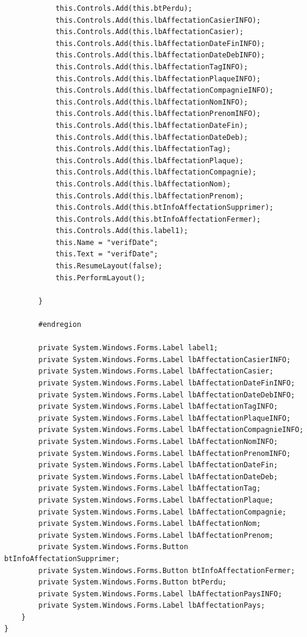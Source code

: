 \documentclass[main.tex]{subfiles}
\begin{document}
\begin{lstlisting}
            this.Controls.Add(this.btPerdu);
            this.Controls.Add(this.lbAffectationCasierINFO);
            this.Controls.Add(this.lbAffectationCasier);
            this.Controls.Add(this.lbAffectationDateFinINFO);
            this.Controls.Add(this.lbAffectationDateDebINFO);
            this.Controls.Add(this.lbAffectationTagINFO);
            this.Controls.Add(this.lbAffectationPlaqueINFO);
            this.Controls.Add(this.lbAffectationCompagnieINFO);
            this.Controls.Add(this.lbAffectationNomINFO);
            this.Controls.Add(this.lbAffectationPrenomINFO);
            this.Controls.Add(this.lbAffectationDateFin);
            this.Controls.Add(this.lbAffectationDateDeb);
            this.Controls.Add(this.lbAffectationTag);
            this.Controls.Add(this.lbAffectationPlaque);
            this.Controls.Add(this.lbAffectationCompagnie);
            this.Controls.Add(this.lbAffectationNom);
            this.Controls.Add(this.lbAffectationPrenom);
            this.Controls.Add(this.btInfoAffectationSupprimer);
            this.Controls.Add(this.btInfoAffectationFermer);
            this.Controls.Add(this.label1);
            this.Name = "verifDate";
            this.Text = "verifDate";
            this.ResumeLayout(false);
            this.PerformLayout();

        }

        #endregion

        private System.Windows.Forms.Label label1;
        private System.Windows.Forms.Label lbAffectationCasierINFO;
        private System.Windows.Forms.Label lbAffectationCasier;
        private System.Windows.Forms.Label lbAffectationDateFinINFO;
        private System.Windows.Forms.Label lbAffectationDateDebINFO;
        private System.Windows.Forms.Label lbAffectationTagINFO;
        private System.Windows.Forms.Label lbAffectationPlaqueINFO;
        private System.Windows.Forms.Label lbAffectationCompagnieINFO;
        private System.Windows.Forms.Label lbAffectationNomINFO;
        private System.Windows.Forms.Label lbAffectationPrenomINFO;
        private System.Windows.Forms.Label lbAffectationDateFin;
        private System.Windows.Forms.Label lbAffectationDateDeb;
        private System.Windows.Forms.Label lbAffectationTag;
        private System.Windows.Forms.Label lbAffectationPlaque;
        private System.Windows.Forms.Label lbAffectationCompagnie;
        private System.Windows.Forms.Label lbAffectationNom;
        private System.Windows.Forms.Label lbAffectationPrenom;
        private System.Windows.Forms.Button btInfoAffectationSupprimer;
        private System.Windows.Forms.Button btInfoAffectationFermer;
        private System.Windows.Forms.Button btPerdu;
        private System.Windows.Forms.Label lbAffectationPaysINFO;
        private System.Windows.Forms.Label lbAffectationPays;
    }
}
\end{lstlisting}

\newpage
\end{document}
